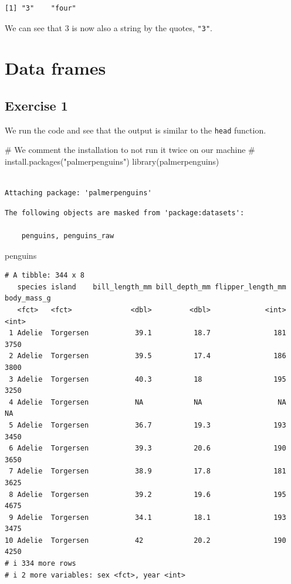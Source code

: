 \documentclass[
  letterpaper,
  DIV=11,
  numbers=noendperiod]{scrreprt}
\newenvironment{Shaded}{\begin{snugshade}}{\end{snugshade}}
\newcommand{\CommentTok}[1]{\textcolor[rgb]{0.37,0.37,0.37}{#1}}
\newcommand{\FunctionTok}[1]{\textcolor[rgb]{0.28,0.35,0.67}{#1}}
\newcommand{\NormalTok}[1]{\textcolor[rgb]{0.00,0.23,0.31}{#1}}
\begin{document}
\begin{verbatim}
[1] "3"    "four"
\end{verbatim}

We can see that 3 is now also a string by the quotes, \texttt{"3"}.

\section{Data frames}\label{data-frames-1}

\subsection{Exercise 1}\label{exercise-1-3}

We run the code and see that the output is similar to the \texttt{head}
function.

\begin{Shaded}
\begin{Highlighting}[]
\CommentTok{\# We comment the installation to not run it twice on our machine}
\CommentTok{\# install.packages("palmerpenguins")}
\FunctionTok{library}\NormalTok{(palmerpenguins)}
\end{Highlighting}
\end{Shaded}

\begin{verbatim}

Attaching package: 'palmerpenguins'
\end{verbatim}

\begin{verbatim}
The following objects are masked from 'package:datasets':

    penguins, penguins_raw
\end{verbatim}

\begin{Shaded}
\begin{Highlighting}[]
\NormalTok{penguins}
\end{Highlighting}
\end{Shaded}

\begin{verbatim}
# A tibble: 344 x 8
   species island    bill_length_mm bill_depth_mm flipper_length_mm body_mass_g
   <fct>   <fct>              <dbl>         <dbl>             <int>       <int>
 1 Adelie  Torgersen           39.1          18.7               181        3750
 2 Adelie  Torgersen           39.5          17.4               186        3800
 3 Adelie  Torgersen           40.3          18                 195        3250
 4 Adelie  Torgersen           NA            NA                  NA          NA
 5 Adelie  Torgersen           36.7          19.3               193        3450
 6 Adelie  Torgersen           39.3          20.6               190        3650
 7 Adelie  Torgersen           38.9          17.8               181        3625
 8 Adelie  Torgersen           39.2          19.6               195        4675
 9 Adelie  Torgersen           34.1          18.1               193        3475
10 Adelie  Torgersen           42            20.2               190        4250
# i 334 more rows
# i 2 more variables: sex <fct>, year <int>
\end{verbatim}
\end{document}
